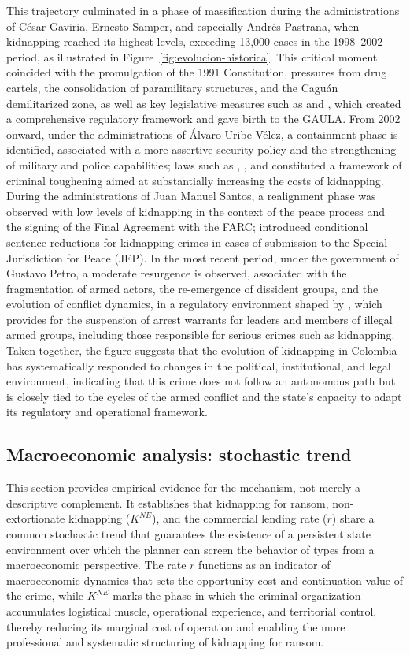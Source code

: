 \documentclass[ecta,nameyear,draft]{econsocart}
\theoremstyle{plain}
\theoremstyle{definition}
\newcommand{\1}{\mathbf{1}}
\begin{document}
This trajectory culminated in a phase of massification during the administrations of César Gaviria, Ernesto Samper, and especially Andrés Pastrana, when kidnapping reached its highest levels, exceeding 13,000 cases in the 1998--2002 period, as illustrated in Figure~\ref{fig:evolucion-historica}. This critical moment coincided with the promulgation of the 1991 Constitution, pressures from drug cartels, the consolidation of paramilitary structures, and the Caguán demilitarized zone, as well as key legislative measures such as \citet{ley40_1993} and \citet{ley282_1996}, which created a comprehensive regulatory framework and gave birth to the GAULA. From 2002 onward, under the administrations of Álvaro Uribe Vélez, a containment phase is identified, associated with a more assertive security policy and the strengthening of military and police capabilities; laws such as \citet{ley733_2002}, \citet{ley890_2004}, and \citet{ley1200_2008} constituted a framework of criminal toughening aimed at substantially increasing the costs of kidnapping. During the administrations of Juan Manuel Santos, a realignment phase was observed with low levels of kidnapping in the context of the peace process and the signing of the Final Agreement with the FARC; \citet{ley1957_2019} introduced conditional sentence reductions for kidnapping crimes in cases of submission to the Special Jurisdiction for Peace (JEP). In the most recent period, under the government of Gustavo Petro, a moderate resurgence is observed, associated with the fragmentation of armed actors, the re-emergence of dissident groups, and the evolution of conflict dynamics, in a regulatory environment shaped by \citet{ley2272_2022}, which provides for the suspension of arrest warrants for leaders and members of illegal armed groups, including those responsible for serious crimes such as kidnapping. Taken together, the figure suggests that the evolution of kidnapping in Colombia has systematically responded to changes in the political, institutional, and legal environment, indicating that this crime does not follow an autonomous path but is closely tied to the cycles of the armed conflict and the state's capacity to adapt its regulatory and operational framework.

\subsection{Macroeconomic analysis: stochastic trend}

This section provides empirical evidence for the mechanism, not merely a descriptive complement. It establishes that kidnapping for ransom, non-extortionate kidnapping ($K^{NE}$), and the commercial lending rate ($r$) share a common stochastic trend that guarantees the existence of a persistent state environment over which the planner can screen the behavior of types from a macroeconomic perspective. The rate $r$ functions as an indicator of macroeconomic dynamics that sets the opportunity cost and continuation value of the crime, while $K^{NE}$ marks the phase in which the criminal organization accumulates logistical muscle, operational experience, and territorial control, thereby reducing its marginal cost of operation and enabling the more professional and systematic structuring of kidnapping for ransom.
\end{document}
